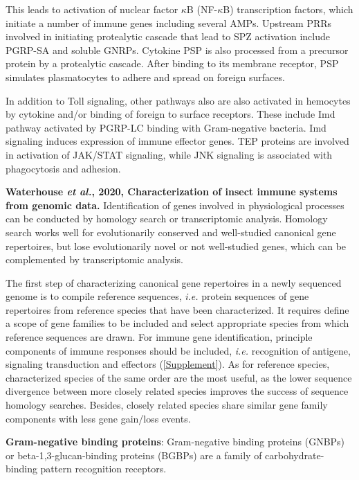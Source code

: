 \documentclass[11pt]{article}
\begin{document}
\begin{sloppypar}
This leads to activation of nuclear factor $\kappa$B (NF-$\kappa$B) transcription factors, which initiate a number of immune genes including several AMPs. 
Upstream PRRs involved in initiating protealytic cascade that lead to SPZ activation include PGRP-SA and soluble GNRPs. 
Cytokine PSP is also processed from a precursor protein by a protealytic cascade. 
After binding to its membrane receptor, PSP simulates plasmatocytes to adhere and spread on foreign surfaces.
\par
In addition to Toll signaling, other pathways also are also activated in hemocytes by cytokine and/or binding of foreign to surface receptors. 
These include Imd pathway activated by PGRP-LC binding with Gram-negative bacteria. 
Imd signaling induces expression of immune effector genes. 
TEP proteins are involved in activation of JAK/STAT signaling, while JNK signaling is associated with phagocytosis and adhesion.  
\par \newline \newline
\textbf{Waterhouse \textit{et al.}, 2020, Characterization of insect immune systems from genomic data.}
Identification of genes involved in physiological processes can be conducted by homology search or transcriptomic analysis. 
Homology search works well for evolutionarily conserved and well-studied canonical gene repertoires, but lose evolutionarily novel or not well-studied genes, which can be complemented by transcriptomic analysis. 
\par
The first step of characterizing canonical gene repertoires in a newly sequenced genome is to compile reference sequences, \textit{i.e.} protein sequences of gene repertoires from reference species that have been characterized. 
It requires define a scope of gene families to be included and select appropriate species from which reference sequences are drawn. 
For immune gene identification, principle components of immune responses should be included, \textit{i.e.} recognition of antigene, signaling transduction and effectors (\ref{Supplement}). 
As for reference species, characterized species of the same order are the most useful, as the lower sequence divergence between more closely related species improves the success of sequence homology searches. 
Besides, closely related species share similar gene family components with less gene gain/loss events. 
\par
\textbf{Gram-negative binding proteins}: Gram-negative binding proteins (GNBPs) or beta-1,3-glucan-­binding proteins (BGBPs) are a family of carbohydrate-binding pattern recognition receptors. \newline

\end{sloppypar}
\end{document}
